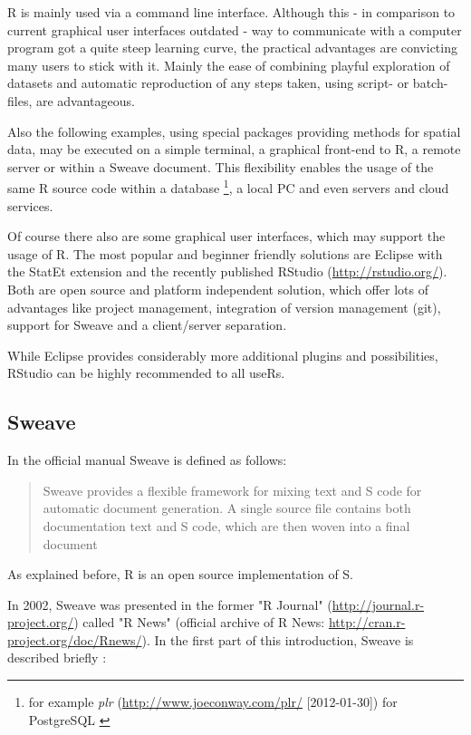 \documentclass{ifacconf}
\begin{document}
R is mainly used via a command line interface. Although this - in comparison
to current graphical user interfaces outdated - way to communicate 
with a computer program got a quite steep learning curve, the practical 
advantages are convicting many users to stick with it. Mainly the
ease of combining playful exploration of datasets and automatic
reproduction of any steps taken, using script- or batch-files, are advantageous.

Also the following examples, using special packages providing methods 
for spatial data, may be executed on a simple terminal, a graphical front-end to R,
a remote server or within a Sweave document. This flexibility enables 
the usage of the same R source code within a database
\footnote{for example \textit{plr} (\url{http://www.joeconway.com/plr/} [2012-01-30]) for PostgreSQL 
\citep{group2011postgresql}}, a local PC and even servers and cloud services.

Of course there also are some graphical user interfaces, which may support
the usage of R. The most popular and beginner friendly solutions are
Eclipse with the StatEt extension and the recently published RStudio
(\url{http://rstudio.org/}). Both are open source and platform independent solution,
which offer lots of advantages like project management, integration of version 
management (git), support for Sweave and a client/server separation.

While Eclipse provides considerably more additional plugins and possibilities,
RStudio can be highly recommended to all useRs.

\subsection{Sweave}
In the official manual \citep{Sweave:Leisch:2002} Sweave is defined as follows:
\begin{quotation}
Sweave provides a flexible 
framework for mixing text 
and S code for automatic document generation. 
A single source file contains both documentation text and S code, which are then woven
into a final document
\end{quotation} 

As explained before, R is an open source implementation of S.

In 2002, Sweave was presented in the former "R Journal"
(\url{http://journal.r-project.org/}) called "R News" (official archive of R News: \url{http://cran.r-project.org/doc/Rnews/}). In the first part of this 
introduction, Sweave is described briefly \citep{Sweave:Leisch:2002}:
\end{document}
